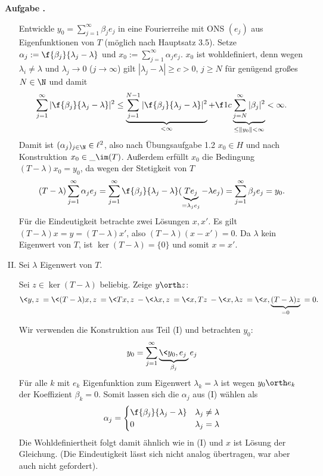 \documentclass{mywork}
\renewenvironment{aufgabe}{\refstepcounter{aufgabe}\par\medskip\noindent%
	\textbf{Aufgabe \thesection.\theaufgabe}\rmfamily}
{\medskip}
\begin{document}
\begin{aufgabe}
\begin{enumerate}[(I)]
				Entwickle $y_0 = \sum_{j=1}^\infty \beta_j e_j$ in eine Fourierreihe mit ONS $(e_j)$ aus Eigenfunktionen von $T$ (möglich nach Hauptsatz 3.5).
				Setze $\alpha_j := \f {\beta_j}{\lambda_j-\lambda}$ und $x_0 := \sum_{j=1}^\infty \alpha_j e_j$.
				$x_0$ ist wohldefiniert, denn wegen $\lambda_i \neq \lambda$ und $\lambda_j \to 0$ ($j\to \infty$) gilt $|\lambda_j - \lambda| \ge c > 0$, $j\ge N$ für genügend großes $N \in \N$ und damit
				\begin{align*}
					\sum_{j=1}^\infty |\f {\beta_j}{\lambda_j-\lambda}|^2
					\le \underbrace{\sum_{j=1}^{N-1} |\f {\beta_j}{\lambda_j-\lambda}|^2}_{<\infty} + \f 1c \underbrace{\sum_{j=N}^\infty |\beta_j|^2}_{\le \|y_0\| < \infty}
					< \infty.
				\end{align*}
				Damit ist $(\alpha_j)_{j\in\N} \in \ell^2$, also nach Übungsaufgabe 1.2 $x_0 \in H$ und nach Konstruktion $x_0 \in \_{\im(T)}$.
				Außerdem erfüllt $x_0$ die Bedingung $(T-\lambda) x_0 = y_0$, da wegen der Stetigkeit von $T$
				\[
					(T-\lambda) \sum_{j=1}^\infty \alpha_j e_j
					= \sum_{j=1}^\infty \f{\beta_j}{\lambda_j - \lambda} ( \underbrace{Te_j}_{= \lambda_j e_j} - \lambda e_j)
					= \sum_{j=1}^\infty \beta_j e_j
					= y_0.
				\]
				Für die Eindeutigkeit betrachte zwei Lösungen $x, x'$.
				Es gilt $(T-\lambda) x = y = (T-\lambda) x'$, also $(T-\lambda)(x - x') = 0$.
				Da $\lambda$ kein Eigenwert von $T$, ist $\ker(T-\lambda) = \{0\}$ und somit $x = x'$.
			\item
				Sei $\lambda$ Eigenwert von $T$.
				\begin{seg}[„$\implies$“]
					Sei $z \in \ker(T-\lambda)$ beliebig. Zeige $y \orth z$:
					\begin{align*}
						\<y,z\> = \<(T-\lambda)x,z\> = \<Tx,z\> - \<\lambda x, z\> = \<x,Tz\> - \<x,\lambda z\> = \<x,\underbrace{(T-\lambda) z}_{=0}\> = 0.
					\end{align*}
				\end{seg}
				\begin{seg}[„$\Longleftarrow$“]
					Wir verwenden die Konstruktion aus Teil (I) und betrachten $y_0$:
					\[
						y_0 = \sum_{j=1}^\infty \underbrace{\<y_0,e_j\>}_{\beta_j} e_j
					\]
					Für alle $k$ mit $e_k$ Eigenfunktion zum Eigenwert $\lambda_k = \lambda$ ist wegen $y_0 \orth e_k$ der Koeffizient $\beta_k = 0$.
					Somit lassen sich die $\alpha_j$ aus (I) wählen als
					\begin{align*}
						\alpha_j = \begin{cases}
							\f {\beta_j}{\lambda_j - \lambda} & \lambda_j \neq \lambda \\
							0 & \lambda_j = \lambda
						\end{cases}
					\end{align*}
					Die Wohldefiniertheit folgt damit ähnlich wie in (I) und $x$ ist Lösung der Gleichung.
					(Die Eindeutigkeit lässt sich nicht analog übertragen, war aber auch nicht gefordert).
				\end{seg}
		\end{enumerate}
	\end{aufgabe}
\end{document}
